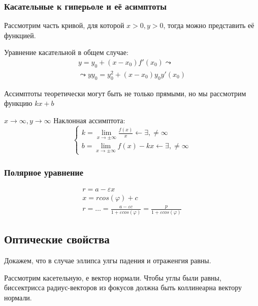 \documentclass[12pt, a4paper]{article}
\begin{document}
    \subsubsection{Касательные к гиперьоле и её асимптоты}

    Рассмотрим часть кривой, для которой $x > 0, y > 0$, тогда можно представить её функцией.

    Уравнение касательной в общем случае:
    \begin{multline}
        y = y_0 + (x - x_0) f'(x_0) \leadsto \\
        \leadsto yy_0 = y_0^2 + (x - x_0) y_0 y'(x_0)
    \end{multline}

    \begin{note}
        Ассимптоты теоретически могут быть не только прямыми, но мы рассмотрим функцию $kx + b$ 
    \end{note}

    $x \to \infty, y \to \infty$
    Наклонная ассимптота:
    \begin{equation}
        \begin{cases}
            k = \lim_{x \to \pm\infty} \frac{f(x)}{x} \longleftarrow \exists, \neq \infty \\
            b = \lim_{x \to \pm\infty} f(x) - kx \longleftarrow \exists, \neq \infty
        \end{cases}
    \end{equation}


    \subsubsection{Полярное уравнение}

    \begin{gather}
        r = a - \varepsilon x \\
        x = r cos(\varphi) + c \\
        r = \dots = \frac{a - \varepsilon c}{1 + \varepsilon cos (\varphi)} = \frac{p}{1 + \varepsilon cos (\varphi)}
    \end{gather}

    \subsection{Оптические свойства}

    Докажем, что в случае эллипса улгы падения и отраженгия равны.

    Рассмотрим касетельную, е вектор нормали.
    Чтобы углы были равны, биссектрисса радиус-векторов из фокусов должна быть коллинеарна вектору нормали.
    
\end{document}
